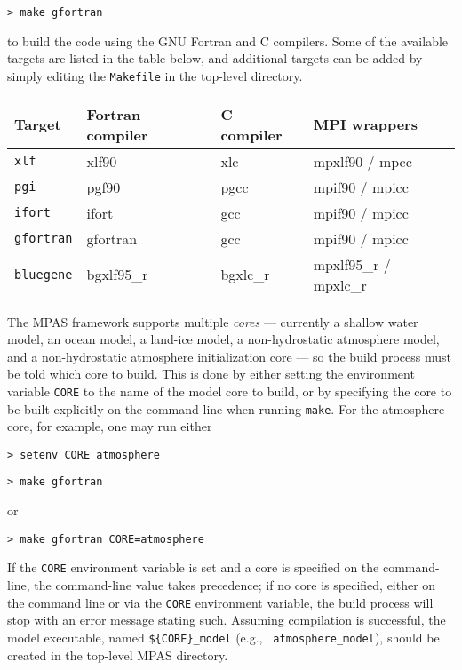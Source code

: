 \vspace{12pt}
{\tt > make gfortran}
\vspace{12pt}

\noindent to build the code using the GNU Fortran and C compilers. Some of the
available targets are listed in the table below, and additional targets can be
added by simply editing the {\tt Makefile} in the top-level directory.

\vspace{12pt}
\begin{longtable}{| l | l | l | l |}
\hline
Target & Fortran compiler & C compiler & MPI wrappers \\ \hline \hline
{\tt xlf} & xlf90 & xlc & mpxlf90 / mpcc \\ \hline
{\tt pgi} & pgf90 & pgcc & mpif90 / mpicc \\ \hline
{\tt ifort} & ifort & gcc & mpif90 / mpicc \\ \hline
{\tt gfortran} & gfortran & gcc & mpif90 / mpicc \\ \hline
{\tt bluegene} & bgxlf95\_r & bgxlc\_r & mpxlf95\_r / mpxlc\_r \\ \hline
\end{longtable}
\vspace{12pt}

The MPAS framework supports multiple {\em cores} --- currently a shallow water
model, an ocean model, a land-ice model, a non-hydrostatic atmosphere model, and
a non-hydrostatic atmosphere initialization core --- so the build process must be told which core
to build. This is done by either setting the environment variable {\tt CORE} to
the name of the model core to build, or by specifying the core to be built
explicitly on the command-line when running {\tt make}. For the atmosphere
core, for example, one may run either

\vspace{12pt}
{\tt > setenv CORE atmosphere}

{\tt > make gfortran}
\vspace{12pt}

\noindent or

\vspace{12pt}
{\tt > make gfortran CORE=atmosphere}
\vspace{12pt}

If the {\tt CORE} environment variable is set and a core is specified on the
command-line, the command-line value takes precedence; if no core is specified,
either on the command line or via the {\tt CORE} environment variable, the build
process will stop with an error message stating such.  Assuming compilation is
successful, the model executable, named {\tt \$\{CORE\}\_model} (e.g., {\tt
atmosphere\_model}), should be created in the top-level MPAS directory.

